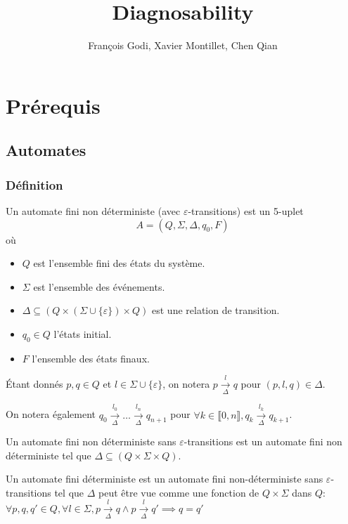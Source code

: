 \documentclass[10pt,a4paper]{article}
\newcommand{\enum}[2]{\llbracket #1, #2 \rrbracket}
\begin{document}
    \title{Diagnosability}

    \author{François Godi, Xavier Montillet, Chen Qian}

\section{Pr\'erequis}

\subsection{Automates}

\subsubsection{D\'efinition}

Un automate fini non déterministe (avec $\varepsilon$-transitions) est un 5-uplet
$$A = (Q, \Sigma, \Delta, q_0, F)$$
o\`u
\begin{itemize}
	\item $Q$ est l'ensemble fini des états du système.
	\item $\Sigma$ est l'ensemble des événements.
	\item $\Delta \subseteq (Q \times (\Sigma \cup \{\varepsilon\}) \times Q)$ est une relation de transition.
	\item $q_0 \in Q$ l'états initial.
	\item $F$ l'ensemble des \'etats finaux.
\end{itemize}

\'Etant donn\'es $p,q \in Q$ et $l\in \Sigma \cup \{\varepsilon\}$, on notera $p \overset{l}{\underset{\Delta}{\to}}q$ pour $(p,l,q) \in \Delta$.

On notera \'egalement $q_0 \overset{l_0}{\underset{\Delta}{\to}} \dots \overset{l_n}{\underset{\Delta}{\to}} q_{n+1}$ pour $\forall k \in \enum{0}{n}, q_k \overset{l_k}{\underset{\Delta}{\to}} q_{k+1}$.



Un automate fini non d\'eterministe sans $\varepsilon$-transitions est un automate fini non d\'eterministe tel que $\Delta \subseteq (Q\times \Sigma \times Q)$.

Un automate fini d\'eterministe est un automate fini non-d\'eterministe sans $\varepsilon$-transitions tel que $\Delta$ peut \^etre vue comme une fonction de $Q\times \Sigma$ dans $Q$: $\forall p,q,q' \in Q, \forall l \in \Sigma, p\overset{l}{\underset{\Delta}{\to}}q \land p\overset{l}{\underset{\Delta}{\to}}q' \implies q=q'$
\end{document}

